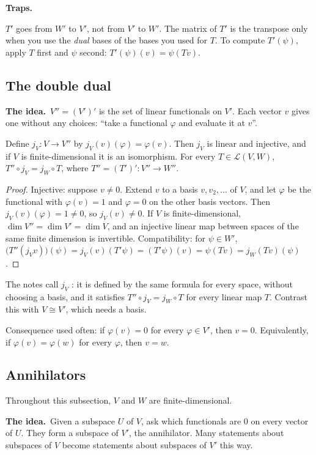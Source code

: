\documentclass[10pt]{scrartcl}
\newcommand{\LL}{\mathcal L}
\newcommand{\traps}{\par\medskip\noindent\textbf{\color{RawSienna}Traps.}\ }
\newcommand{\idea}{\par\noindent\textbf{\color{MidnightBlue}The idea.}\ }
\begin{document}
\traps
\begin{itemize}
  \ii $T'$ goes from $W'$ to $V'$, not from $V'$ to $W'$.
  \ii The matrix of $T'$ is the transpose only when you use the \emph{dual} bases of the bases you used for $T$.
  \ii To compute $T'(\psi)$, apply $T$ first and $\psi$ second: $T'(\psi)(v)=\psi(Tv)$.
\end{itemize}

\subsection{The double dual}
\idea $V''=(V')'$ is the set of linear functionals on $V'$. Each vector $v$ gives one without any choices: ``take a functional $\varphi$ and evaluate it at $v$''.

\begin{proposition*}
  Define $j_V\colon V\to V''$ by $j_V(v)(\varphi)=\varphi(v)$. Then $j_V$ is linear and injective, and if $V$ is finite-dimensional it is an isomorphism. For every $T\in\LL(V,W)$, $T''\circ j_V=j_W\circ T$, where $T''=(T')'\colon V''\to W''$.
\end{proposition*}
\begin{proof}
  Injective: suppose $v\ne0$. Extend $v$ to a basis $v,v_2,\dots$ of $V$, and let $\varphi$ be the functional with $\varphi(v)=1$ and $\varphi=0$ on the other basis vectors. Then $j_V(v)(\varphi)=1\ne0$, so $j_V(v)\ne0$. If $V$ is finite-dimensional, $\dim V''=\dim V'=\dim V$, and an injective linear map between spaces of the same finite dimension is invertible.
  Compatibility: for $\psi\in W'$, $\big(T''(j_Vv)\big)(\psi)=j_V(v)(T'\psi)=(T'\psi)(v)=\psi(Tv)=j_W(Tv)(\psi)$.
\end{proof}
The notes call $j_V$ : it is defined by the same formula for every space, without choosing a basis, and it satisfies $T''\circ j_V=j_W\circ T$ for every linear map $T$. Contrast this with $V\cong V'$, which needs a basis.

Consequence used often: if $\varphi(v)=0$ for every $\varphi\in V'$, then $v=0$. Equivalently, if $\varphi(v)=\varphi(w)$ for every $\varphi$, then $v=w$.

\subsection{Annihilators}\label{sec:annih}
Throughout this subsection, $V$ and $W$ are finite-dimensional.

\idea Given a subspace $U$ of $V$, ask which functionals are $0$ on every vector of $U$. They form a subspace of $V'$, the annihilator. Many statements about subspaces of $V$ become statements about subspaces of $V'$ this way.
\end{document}
